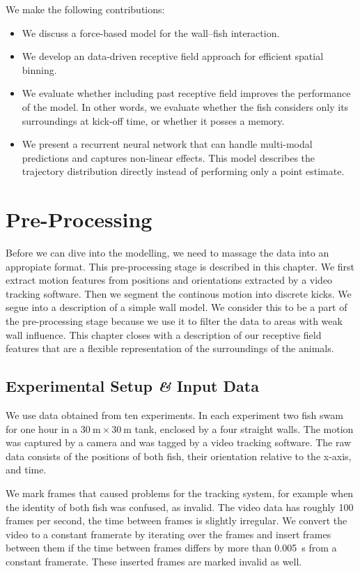 \documentclass[nobib]{tufte-handout}
\begin{document}
We make the following contributions:
\begin{itemize}
\item We discuss a force-based model for the wall--fish interaction.
\item We develop an data-driven receptive field approach for efficient spatial binning.
\item We evaluate whether including past receptive field improves the performance of the model.
  In other words, we evaluate whether the fish considers only its surroundings at kick-off time, or whether it posses a memory.
\item We present a recurrent neural network that can handle multi-modal predictions and captures non-linear effects.
  This model describes the trajectory distribution directly instead of performing only a point estimate.
\end{itemize}

\section{Pre-Processing}
Before we can dive into the modelling, we need to massage the data into an appropiate format.
This pre-processing stage is described in this chapter.
We first extract motion features from positions and orientations extracted by a video tracking software.
Then we segment the continous motion into discrete kicks.
We segue into a description of a simple wall model.
We consider this to be a part of the pre-processing stage because we use it to filter the data to areas with weak wall influence.
This chapter closes with a description of our receptive field features that are a flexible representation of the surroundings of the animals.

\subsection{Experimental Setup \textit{\&} Input Data}
We use data obtained from ten experiments.
In each experiment two fish swam for one hour in a \(\SI{30}{\m} \times \SI{30}{\m}\) tank, enclosed by a four straight walls.
The motion was captured by a camera and was tagged by a video tracking software.
The raw data consists of the positions of both fish, their orientation relative to the x-axis, and time.

We mark frames that caused problems for the tracking system, for example when the identity of both fish was confused, as invalid.
The video data has roughly 100 frames per second, the time between frames is slightly irregular.
We convert the video to a constant framerate by iterating over the frames and insert frames between them if the time between frames differs by more than \SI{0.005}{\s} from a constant framerate.
These inserted frames are marked invalid as well.
\end{document}
